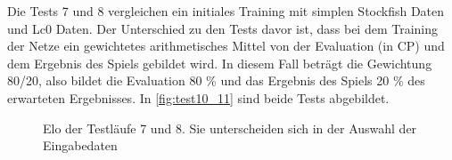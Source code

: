 Die Tests 7 und 8 vergleichen ein initiales Training mit simplen Stockfish Daten und \ac{Lc0} Daten. Der Unterschied zu den Tests davor ist, dass bei dem Training der Netze ein gewichtetes arithmetisches Mittel von der Evaluation (in \ac{CP}) und dem Ergebnis des Spiels gebildet wird. In diesem Fall beträgt die Gewichtung 80/20, also bildet die Evaluation 80 \% und das Ergebnis des Spiels 20 \% des erwarteten Ergebnisses. In \autoref{fig:test10_11} sind beide Tests abgebildet.

\begin{figure}
  \centering
  \caption{Elo der Testläufe 7 und 8. Sie unterscheiden sich in der Auswahl der Eingabedaten}
  \label{fig:test10_11}
\end{figure}



